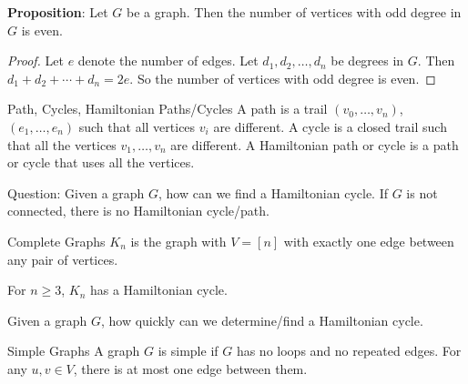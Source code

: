 \documentclass{report}
\begin{document}
\textbf{Proposition}: Let $G$ be a graph. Then the number of vertices with odd degree in $G$ is even. 
    \begin{proof}
        Let $e$ denote the number of edges. Let $d_{1}, d_{2}, \ldots, d_{n}$ be degrees in $G$. Then $d_{1} + d_{2} + \cdots+ d_{n} = 2e$. So the number of vertices with odd degree is even.
    \end{proof}

\begin{definition}{Path, Cycles, Hamiltonian Paths/Cycles}
    A path is a trail $(v_{0}, \ldots, v_{n})$, $(e_{1}, \ldots, e_{n})$ such that all vertices $v_{i}$ are different. A cycle is a closed trail such that all the vertices $v_{1}, \ldots, v_{n}$  are different. A Hamiltonian path or cycle is a path or cycle that uses all the vertices.
\end{definition}

Question: Given a graph $G$, how can we find a Hamiltonian cycle. If $G$ is not connected, there is no Hamiltonian cycle/path.

\begin{definition}{Complete Graphs}
    $K_{n}$ is the graph with $V = [n]$ with exactly one edge between any pair of vertices.
\end{definition}

For $n \geq3$, $K_{n}$ has a Hamiltonian cycle.

Given a graph $G$, how quickly can we determine/find a Hamiltonian cycle.

\begin{definition}{Simple Graphs}
    A graph $G$ is simple if $G$ has no loops and no repeated edges. For any $u, v \in V$, there is at most one edge between them.
\end{definition}
\end{document}
